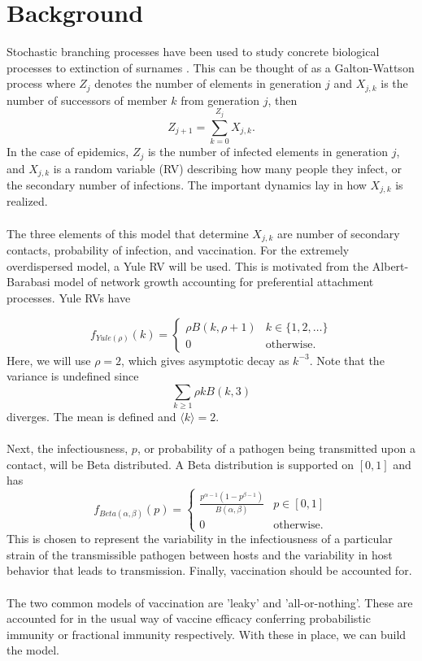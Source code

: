 \documentclass[11pt, twocolumn]{article}
\begin{document}
\section*{Background}
Stochastic branching processes have been used to study concrete biological processes to extinction of surnames \cite{last names guy}. This can be thought of as a Galton-Wattson process where $Z_j$ denotes the number of elements in generation $j$ and $X_{j, k}$ is the number of successors of member $k$ from generation $j$, then 
\begin{equation}
	Z_{j+1} = \sum_{k=0}^{Z_j}X_{j,k}. \label{eqn:GW}
\end{equation}
In the case of epidemics, $Z_j$ is the number of infected elements in generation $j$, and $X_{j, k}$ is a random variable (RV) describing how many people they infect, or the secondary number of infections. The important dynamics lay in how $X_{j,k}$ is realized.\\ \\
The three elements of this model that determine $X_{j,k}$ are number of secondary contacts, probability of infection, and vaccination. For the extremely overdispersed model, a Yule RV will be used. This is motivated from the Albert-Barabasi model of network growth accounting for preferential attachment processes. Yule RVs have

\begin{equation}
	f_{Yule(\rho)}(k)=
	\begin{cases}
		\rho B(k, \rho+1)& k \in \{1, 2, \ldots\}\\
		0&\text{otherwise}.
	\end{cases}
\end{equation}
Here, we will use $\rho=2$, which gives asymptotic decay as $k^{-3}$. Note that the variance is undefined since
\begin{equation}
	\sum_{k\geq 1}\rho k B(k, 3)
\end{equation}
diverges. The mean is defined and $\langle k \rangle =2$. \\ \\
Next, the infectiousness, $p$, or probability of a pathogen being transmitted upon a contact, will be Beta distributed. A Beta distribution is supported on $[0,1]$ and has
\begin{equation}
	f_{Beta(\alpha, \beta)}(p)=\begin{cases}
	\frac{p^{\alpha-1}(1-p^{\beta-1})}{B(\alpha, \beta)}&p\in[0,1]\\
	0&\text{otherwise}.
	\end{cases}
\end{equation}
This is chosen to represent the variability in the infectiousness of a particular strain of the transmissible pathogen between hosts and the variability in host behavior that leads to transmission. Finally, vaccination should be accounted for. \\ \\
The two common models of vaccination are 'leaky' and 'all-or-nothing'. These are accounted for in the usual way of vaccine efficacy conferring probabilistic immunity or fractional immunity respectively. With these in place, we can build the model.
\end{document}
